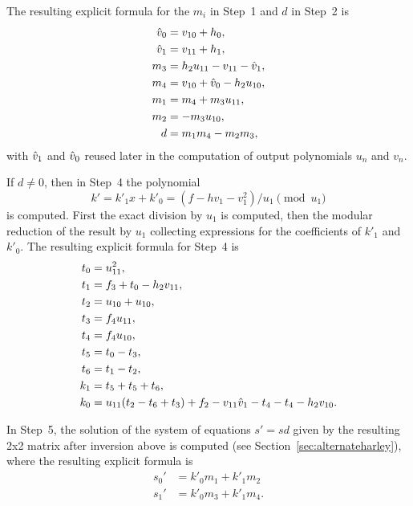 The resulting explicit formula for the $m_i$ in Step~1 and $d$ in Step~2 is 
\begin{align*}
    \hat{v}_0 &= v_{10} + h_0, \\
    \hat{v}_1 &= v_{11} + h_1,\\
    m_3 &= h_2u_{11} - v_{11} - \hat{v}_1,\\
    m_4 &= v_{10} + \hat{v}_0 - h_2u_{10},\\ 
    m_1 &= m_4 + m_3u_{11},\\
    m_2 &= -m_3u_{10}, \\
    d &= m_1m_4 - m_2m_3,
\end{align*} with $\hat{v}_1$ and $\hat{v}_0$ reused later in the computation of output
polynomials $u_n$ and $v_n$.

If $d \neq 0$, then in Step~4 the polynomial $$k' = k'_1x + k'_0 = (f- hv_1 -
v_1^2)/u_1 \pmod{u_1}$$ is computed. First the exact division by $u_1$ is
computed, then the modular reduction of the result by $u_1$ collecting
expressions for the coefficients of $k'_1$ and $k'_0$. The resulting explicit
formula for Step~4 is
\begin{align*}
    t_0 &= u_{11}^2,\\
    t_1 &= f_3 + t_0 - h_2v_{11},\\
    t_2 &= u_{10} + u_{10},\\
    t_3 &= f_4u_{11},\\
    t_4 &= f_4u_{10},\\
    t_5 &= t_0 - t_3,\\
    t_6 &= t_1 - t_2,\\
    k_1 &= t_5 + t_5 + t_6,\\
    k_0 &= u_{11}(t_2 - t_6 + t_3) + f_2 - v_{11}\hat{v}_1 - t_4 - t_4 - h_2v_{10}.
\end{align*}

In Step~5, the solution of the system of equations $s' = sd$ given by the
resulting 2x2 matrix after inversion above is computed (see
Section~\ref{sec:alternateharley}), where the resulting explicit formula is
\begin{align*}
s_0' &= k'_0m_1 + k'_1m_2\\
s_1' &= k'_0m_3 + k'_1m_4.
\end{align*}
    
